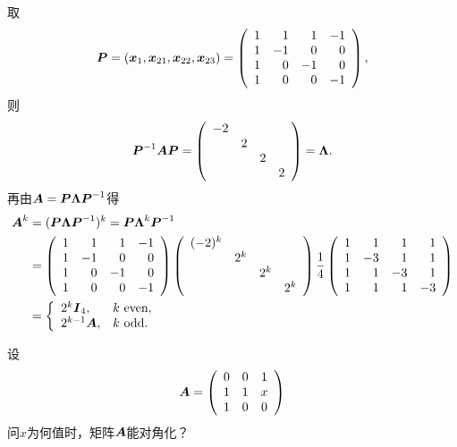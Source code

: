\begin{frame}
\begin{jie}
  取
  $$
  \boldsymbol{P}=({\boldsymbol{x}}_1,{\boldsymbol{x}}_{21},{\boldsymbol{x}}_{22},{\boldsymbol{x}}_{23})=
  \left(
    \begin{array}{rrrr}
      1& 1& 1&-1\\
      1&-1& 0& 0\\
      1& 0&-1& 0\\
      1& 0& 0&-1
    \end{array}
  \right),
  $$
  则
  $$
  \boldsymbol{P}^{-1}\boldsymbol{A}\boldsymbol{P}=\left(
    \begin{array}{rrrr}
      -2&&&\\
        &2&&\\
        &&2\\
        &&&2
    \end{array}
  \right)=\boldsymbol{\Lambda}.
  $$
  再由$\boldsymbol{A}=\boldsymbol{P}\boldsymbol{\Lambda}\boldsymbol{P}^{-1}$得
  $$
  \begin{aligned}
    \boldsymbol{A}^k&=(\boldsymbol{P}\boldsymbol{\Lambda}\boldsymbol{P}^{-1})^k=\boldsymbol{P}\boldsymbol{\Lambda}^k\boldsymbol{P}^{-1}\\
    &=\left(
    \begin{array}{rrrr}
      1& 1& 1&-1\\
      1&-1& 0& 0\\
      1& 0&-1& 0\\
      1& 0& 0&-1
    \end{array}
  \right)
  \left(
    \begin{array}{rrrr}
      (-2)^k&&&\\
        &2^k&&\\
        &&2^k\\
        &&&2^k
    \end{array}
  \right)
  \frac14
  \left(
    \begin{array}{rrrr}
      1& 1& 1& 1\\
      1&-3& 1& 1\\
      1& 1&-3& 1\\
      1& 1& 1&-3
    \end{array}
  \right)\\
  &=\left\{
    \begin{array}{ll}
      2^k \boldsymbol{I}_4, & k\mbox{ even}, \\
      2^{k-1} \boldsymbol{A}, & k\mbox{ odd}.
    \end{array}
  \right.
  \end{aligned}
  $$
\end{jie}

\end{frame}

\begin{frame}[fragile]\ft{\secname}

\begin{li}
  设
  $$
  \boldsymbol{A}=\left(
    \begin{array}{ccc}
      0&0&1\\
      1&1&x\\
      1&0&0
    \end{array}
  \right)
  $$
  问$x$为何值时，矩阵$\boldsymbol{A}$能对角化？
\end{li}
\end{frame}

